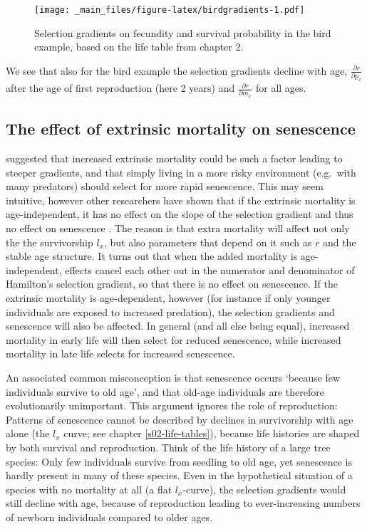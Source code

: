 \documentclass[
]{book}
\begin{document}
\begin{figure}
\centering
\texttt{[image: \_main\_files/figure-latex/birdgradients-1.pdf]}
\caption{\label{fig:birdgradients}Selection gradients on fecundity and survival probability in the bird example, based on the life table from chapter 2.}
\end{figure}

We see that also for the bird example the selection gradients decline with age, \(\frac{\partial r}{\partial p_x}\) after the age of first reproduction (here 2 years) and \(\frac{\partial r}{\partial m_x}\) for all ages.

\hypertarget{the-effect-of-extrinsic-mortality-on-senescence}{%
\subsection*{The effect of extrinsic mortality on senescence}\label{the-effect-of-extrinsic-mortality-on-senescence}}

\citet{Williams1} suggested that increased extrinsic mortality could be such a factor leading to steeper gradients, and that simply living in a more risky environment (e.g.~with many predators) should select for more rapid senescence. This may seem intuitive, however other researchers have shown that if the extrinsic mortality is age-independent, it has no effect on the slope of the selection gradient and thus no effect on senescence \citep{Hamilton1, Caswell7, Wensink1}. The reason is that extra mortality will affect not only the the survivorship \(l_x\), but also parameters that depend on it such as \(r\) and the stable age structure. It turns out that when the added mortality is age-independent, effects cancel each other out in the numerator and denominator of Hamilton's selection gradient, so that there is no effect on senescence. If the extrinsic mortality is age-dependent, however (for instance if only younger individuals are exposed to increased predation), the selection gradients and senescence will also be affected. In general (and all else being equal), increased mortality in early life will then select for reduced senescence, while increased mortality in late life selects for increased senescence.

An associated common misconception is that senescence occurs `because few individuals survive to old age', and that old-age individuals are therefore evolutionarily unimportant. This argument ignores the role of reproduction: Patterns of senescence cannot be described by declines in survivorship with age alone (the \(l_x\) curve; see chapter \ref{s02-life-tables}), because life histories are shaped by both survival and reproduction. Think of the life history of a large tree species: Only few individuals survive from seedling to old age, yet senescence is hardly present in many of these species. Even in the hypothetical situation of a species with no mortality at all (a flat \(l_x\)-curve), the selection gradients would still decline with age, because of reproduction leading to ever-increasing numbers of newborn individuals compared to older ages.
\end{document}
